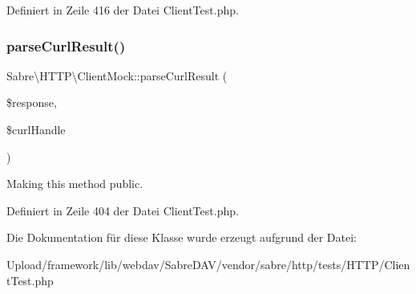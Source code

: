 Definiert in Zeile 416 der Datei Client\+Test.\+php.

\mbox{\label{class_sabre_1_1_h_t_t_p_1_1_client_mock_a14f13401b12eaeafc2c9a1eadef76cb8}} 
\subsubsection{\texorpdfstring{parse\+Curl\+Result()}{parseCurlResult()}}
{\footnotesize\ttfamily Sabre\textbackslash{}\+H\+T\+T\+P\textbackslash{}\+Client\+Mock\+::parse\+Curl\+Result (\begin{DoxyParamCaption}\item[{}]{\$response,  }\item[{}]{\$curl\+Handle }\end{DoxyParamCaption})}

Making this method public. 

Definiert in Zeile 404 der Datei Client\+Test.\+php.



Die Dokumentation für diese Klasse wurde erzeugt aufgrund der Datei\+:\begin{DoxyCompactItemize}
\item 
Upload/framework/lib/webdav/\+Sabre\+D\+A\+V/vendor/sabre/http/tests/\+H\+T\+T\+P/Client\+Test.\+php\end{DoxyCompactItemize}
